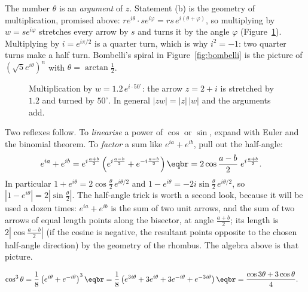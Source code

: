 The number $\theta$ is an \emph{argument} of $z$. Statement (b) is the geometry of multiplication, promised above: $re^{i\theta}\cdot se^{i\varphi}=rs\,e^{i(\theta+\varphi)}$,
so multiplying by $w=se^{i\varphi}$ stretches every arrow by $s$ and turns it by the angle $\varphi$ (Figure~\ref{fig:multiply}). Multiplying by $i=e^{i\pi/2}$ is a
quarter turn, which is why $i^2=-1$: two quarter turns make a half turn. Bombelli's spiral in Figure~\ref{fig:bombelli} is the picture of $(\sqrt5e^{i\theta})^n$
with $\theta=\arctan\frac12$.

\begin{figure}[ht]
\centering
{}
\caption{Multiplication by $w=1.2\,e^{i\cdot50^\circ}$: the arrow $z=2+i$ is stretched by $1.2$ and turned by $50^\circ$. In general $|zw|=|z|\,|w|$ and the arguments add.}
\label{fig:multiply}
\end{figure}

Two reflexes follow. To \emph{linearise} a power of $\cos$ or $\sin$, expand with Euler and the binomial theorem.
To \emph{factor} a sum like $e^{ia}+e^{ib}$, pull out the half-angle:
\[
\begin{aligned}e^{ia}+e^{ib}&=e^{i\frac{a+b}2}\left(e^{i\frac{a-b}2}+e^{-i\frac{a-b}2}\right)\eqbr=2\cos\frac{a-b}2\;e^{i\frac{a+b}2}.\end{aligned}
\]
In particular $1+e^{i\theta}=2\cos\frac\theta2\,e^{i\theta/2}$ and $1-e^{i\theta}=-2i\sin\frac\theta2\,e^{i\theta/2}$,
so $|1-e^{i\theta}|=2\left|\sin\frac\theta2\right|$. The half-angle trick is worth a second look, because it will be used a dozen times: $e^{ia}+e^{ib}$ is
the sum of two unit arrows, and the sum of two arrows of equal length points along the bisector, at angle $\frac{a+b}2$; its length is $2\left|\cos\frac{a-b}2\right|$ (if the cosine is negative, the resultant points opposite to the chosen half-angle direction) by
the geometry of the rhombus. The algebra above is that picture.

\begin{example}
\[\begin{aligned}\cos^3\theta&=\frac18\left(e^{i\theta}+e^{-i\theta}\right)^3\eqbr=\frac18\left(e^{3i\theta}+3e^{i\theta}+3e^{-i\theta}+e^{-3i\theta}\right)
\eqbr=\frac{\cos3\theta+3\cos\theta}4.\end{aligned}\]
\end{example}

